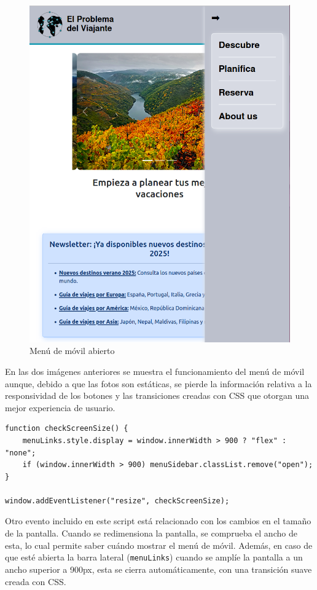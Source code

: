 \documentclass[11pt, a4paper]{book}
\begin{document}
	\begin{figure} [H]
		\centering
		\includegraphics[height=0.4\textheight]{CSS/1 extra1.png}
		\caption{Menú de móvil abierto}
	\end{figure}

	En las dos imágenes anteriores se muestra el funcionamiento del menú de móvil aunque, debido a que las fotos son estáticas, se pierde la información relativa a la responsividad de los botones y las transiciones creadas con CSS que otorgan una mejor experiencia de usuario.
	
	\begin{lstlisting}
function checkScreenSize() {
	menuLinks.style.display = window.innerWidth > 900 ? "flex" : "none";
	if (window.innerWidth > 900) menuSidebar.classList.remove("open");
}

window.addEventListener("resize", checkScreenSize);
	\end{lstlisting}

	Otro evento incluido en este script está relacionado con los cambios en el tamaño de la pantalla. Cuando se redimensiona la pantalla, se comprueba el ancho de esta, lo cual permite saber cuándo mostrar el menú de móvil. Además, en caso de que esté abierta la barra lateral (\texttt{menuLinks}) cuando se amplíe la pantalla a un ancho superior a 900px, esta se cierra automáticamente, con una transición suave creada con CSS.
	
\end{document}
